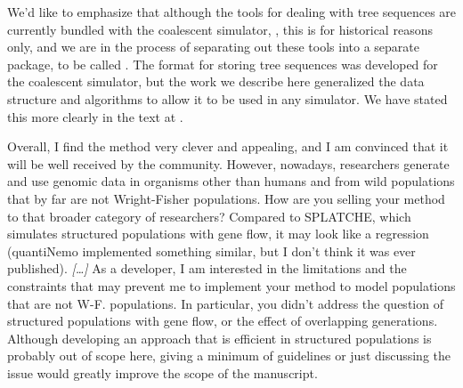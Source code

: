 We'd like to emphasize that although the tools for dealing with tree sequences
are currently bundled with the coalescent simulator, \msprime{},
this is for historical reasons only, 
and we are in the process of separating out these tools into a separate package,
to be called \tskit.
The format for storing tree sequences was developed for the coalescent simulator,
but the work we describe here generalized the data structure and algorithms
to allow it to be used in any simulator.
We have stated this more clearly in the text at .


\begin{point}{}
    Overall, I find the method very clever and appealing, and I am convinced that
    it will be well received by the community. However, nowadays, researchers
    generate and use genomic data in organisms other than humans and from wild
    populations that by far are not Wright-Fisher populations. How are you selling
    your method to that broader category of researchers? Compared to SPLATCHE,
    which simulates structured populations with gene flow, it may look like a
    regression (quantiNemo implemented something similar, but I don't think it was
    ever published).
    \emph{[\ldots]}
    As a developer, I am interested in the limitations and the constraints that may
    prevent me to implement your method to model populations that are not W-F.
    populations. In particular, you didn't address the question of structured
    populations with gene flow, or the effect of overlapping generations. Although
    developing an approach that is efficient in structured populations is probably
    out of scope here, giving a minimum of guidelines or just discussing the issue
    would greatly improve the scope of the manuscript.
\end{point}



